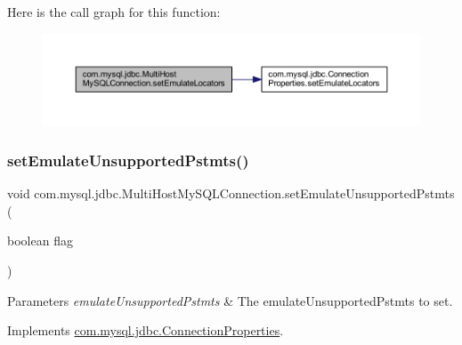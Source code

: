 Here is the call graph for this function\+:
\nopagebreak
\begin{figure}[H]
\begin{center}
\leavevmode
\includegraphics[width=350pt]{classcom_1_1mysql_1_1jdbc_1_1_multi_host_my_s_q_l_connection_acf59bfc5610337b83b617986cfb1b2a5_cgraph}
\end{center}
\end{figure}
\mbox{\label{classcom_1_1mysql_1_1jdbc_1_1_multi_host_my_s_q_l_connection_a7c475a0b1f3d339fa0bab4863ac31609}} 
\subsubsection{\texorpdfstring{set\+Emulate\+Unsupported\+Pstmts()}{setEmulateUnsupportedPstmts()}}
{\footnotesize\ttfamily void com.\+mysql.\+jdbc.\+Multi\+Host\+My\+S\+Q\+L\+Connection.\+set\+Emulate\+Unsupported\+Pstmts (\begin{DoxyParamCaption}\item[{boolean}]{flag }\end{DoxyParamCaption})}


\begin{DoxyParams}{Parameters}
{\em emulate\+Unsupported\+Pstmts} & The emulate\+Unsupported\+Pstmts to set. \\
\hline
\end{DoxyParams}


Implements \mbox{\hyperlink{interfacecom_1_1mysql_1_1jdbc_1_1_connection_properties_ad1ece011a4fffaed971f9849aa966183}{com.\+mysql.\+jdbc.\+Connection\+Properties}}.

